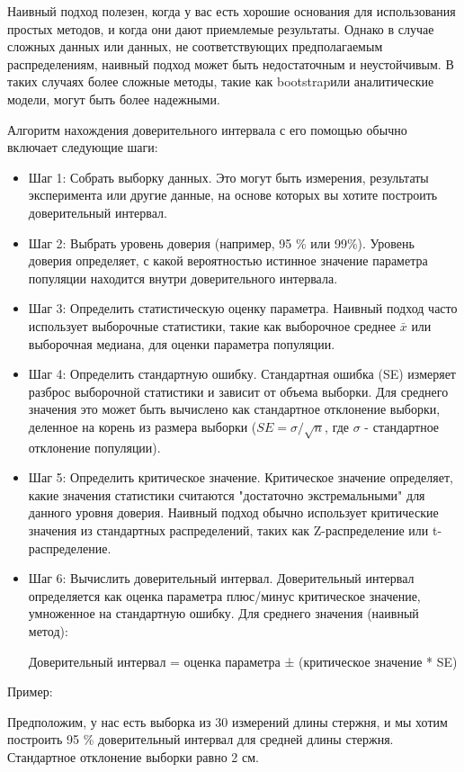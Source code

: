\documentclass[specialist,
               substylefile = spbu_report.rtx,
               subf,href,colorlinks=true, 12pt]{disser}
\begin{document}
Наивный подход полезен, когда у вас есть хорошие основания для использования простых методов, и когда они дают приемлемые результаты. Однако в случае сложных данных или данных, не соответствующих предполагаемым распределениям, наивный подход может быть недостаточным и неустойчивым. В таких случаях более сложные методы, такие как bootstrapили аналитические модели, могут быть более надежными.

Алгоритм нахождения доверительного интервала с его помощью обычно включает следующие шаги:
\begin{itemize}
    \item Шаг 1: Собрать выборку данных. Это могут быть измерения, результаты эксперимента или другие данные, на основе которых вы хотите построить доверительный интервал.
    \item Шаг 2: Выбрать уровень доверия (например, 95 \% или 99\%). Уровень доверия определяет, с какой вероятностью истинное значение параметра популяции находится внутри доверительного интервала.
    \item Шаг 3: Определить статистическую оценку параметра. Наивный подход часто использует выборочные статистики, такие как выборочное среднее $\bar{x}$ или выборочная медиана, для оценки параметра популяции.
    \item Шаг 4: Определить стандартную ошибку. Стандартная ошибка (SE) измеряет разброс выборочной статистики и зависит от объема выборки. Для среднего значения это может быть вычислено как стандартное отклонение выборки, деленное на корень из размера выборки ($SE = \sigma / \sqrt{n} $, где $\sigma$ - стандартное отклонение популяции).
    \item Шаг 5: Определить критическое значение. Критическое значение определяет, какие значения статистики считаются "достаточно экстремальными" для данного уровня доверия. Наивный подход обычно использует критические значения из стандартных распределений, таких как Z-распределение или t-распределение.
    \item Шаг 6: Вычислить доверительный интервал. Доверительный интервал определяется как оценка параметра плюс/минус критическое значение, умноженное на стандартную ошибку. Для среднего значения (наивный метод):
    
    Доверительный интервал = оценка параметра ± (критическое значение * SE)

\end{itemize}

Пример:

Предположим, у нас есть выборка из 30 измерений длины стержня, и мы хотим построить 95 \% доверительный интервал для средней длины стержня. Стандартное отклонение выборки равно 2 см.
\end{document}
